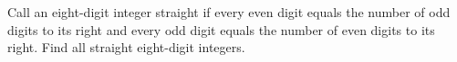 Call an eight-digit integer straight if every even digit equals the number of odd digits to its right and every odd digit equals the number of even digits to its right. Find all straight eight-digit integers.
